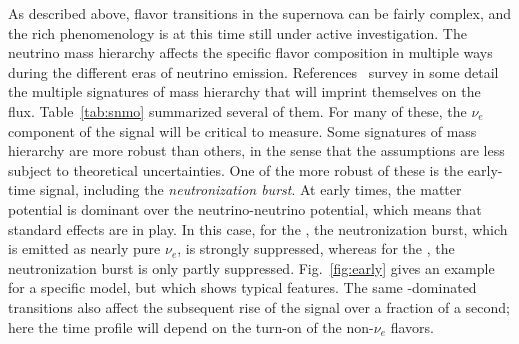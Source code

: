 As described above, flavor transitions
in the supernova can be fairly complex, and the rich phenomenology is
at this time still under active investigation.  The neutrino mass
hierarchy affects the specific flavor composition in multiple ways
during the different eras of neutrino emission.  
References~\cite{Mirizzi:2015eza,Scholberg:2017czd} survey in some detail the
multiple signatures of mass hierarchy that will imprint themselves on
the flux.  Table~\ref{tab:snmo} summarized several of them. For many of these, the $\nu_e$ component of the signal will
be critical to measure.    Some signatures of mass hierarchy are more robust than
others, in the sense that the assumptions are less subject to
theoretical uncertainties.  One of the more robust of these is the
early-time signal, including the \textit{neutronization burst}.   At
early times, the matter potential is dominant over the
neutrino-neutrino potential, which means that standard  effects are
in play.  In this case, for the , the neutronization burst, which is
emitted as nearly pure $\nu_e$, is strongly suppressed, whereas for
the , the neutronization burst is only partly suppressed.  
Fig.~\ref{fig:early} gives an example for a specific model, but which
shows typical features.  The same -dominated transitions also
affect
the subsequent rise of the signal over a fraction of a second; here
the time profile will depend on the turn-on of the non-$\nu_e$ flavors.

